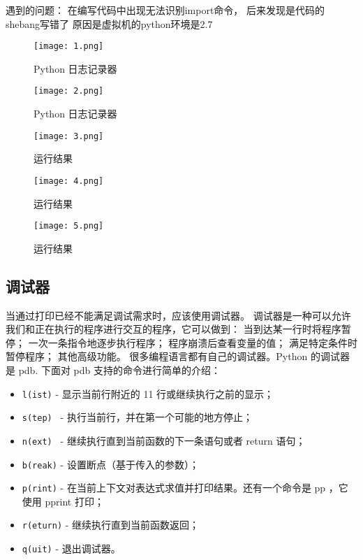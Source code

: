 \documentclass[a4paper, 12pt]{article}
\begin{document}
遇到的问题：
在编写代码中出现无法识别import命令，
后来发现是代码的shebang写错了
原因是虚拟机的python环境是2.7
\begin{figure}[H]
  \centering
    \texttt{[image: 1.png]}
  \caption{Python 日志记录器}
   \end{figure}

\begin{figure}[H]
  \centering
    \texttt{[image: 2.png]}
  \caption{Python 日志记录器}
   \end{figure}

\begin{figure}[H]
  \centering
    \texttt{[image: 3.png]}
  \caption{运行结果}
   \end{figure}

\begin{figure}[H]
  \centering
    \texttt{[image: 4.png]}
  \caption{运行结果}
   \end{figure}
   
   \begin{figure}[H]
  \centering
    \texttt{[image: 5.png]}
  \caption{运行结果}
   \end{figure}
   
\subsection{调试器}  

当通过打印已经不能满足调试需求时，应该使用调试器。
调试器是一种可以允许我们和正在执行的程序进行交互的程序，它可以做到：
当到达某一行时将程序暂停；
一次一条指令地逐步执行程序；
程序崩溃后查看变量的值；
满足特定条件时暂停程序；
其他高级功能。
很多编程语言都有自己的调试器。Python 的调试器是 pdb.
下面对 pdb 支持的命令进行简单的介绍：

\begin{itemize}
  \item \texttt{l(ist)}    - 显示当前行附近的 11 行或继续执行之前的显示；
   \item \texttt{s(tep) }   - 执行当前行，并在第一个可能的地方停止；
  \item \texttt{n(ext) }   - 继续执行直到当前函数的下一条语句或者 return 语句；
  \item \texttt{b(reak)}   - 设置断点（基于传入的参数）；
 \item \texttt{p(rint)}   - 在当前上下文对表达式求值并打印结果。还有一个命令是 pp ，它使用 pprint 打印；
 \item \texttt{r(eturn)}  - 继续执行直到当前函数返回；
 \item \texttt{q(uit)}  - 退出调试器。
  \end{itemize}
\end{document}
